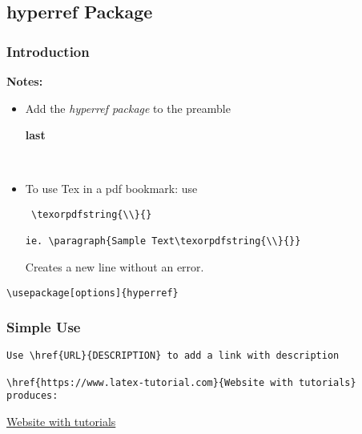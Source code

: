 \documentclass[class=article, crop=false, titlepage, twoside, multi={itemize, figure, verbatim}, float=false]{standalone}
\title{}  %
\begin{document}

\ifstandalone
\maketitle %
\clearpage
\tableofcontents %
\clearpage
\fi

\subsection[hyperref Package]{\LARGE hyperref Package}

\subsubsection[Introduction]{\Large Introduction}

\textbf{Notes:} 
\begin{itemize}
\item Add the \textit{hyperref package} to the preamble\begin{large}\textbf{ last}\end{large}~\cite{hyperref}
\item To use Tex in a pdf bookmark: use \begin{verbatim} \texorpdfstring{\\}{}

ie. \paragraph{Sample Text\texorpdfstring{\\}{}}\end{verbatim}
Creates a new line without an error.
\end{itemize}

\begin{verbatim}\usepackage[options]{hyperref}\end{verbatim}

\subsubsection[Simple Use]{\Large Simple Use}
\begin{verbatim}Use \href{URL}{DESCRIPTION} to add a link with description

\href{https://www.latex-tutorial.com}{Website with tutorials}
produces:
\end{verbatim}
\href{https://www.latex-tutorial.com}{Website with tutorials}
\end{document}
